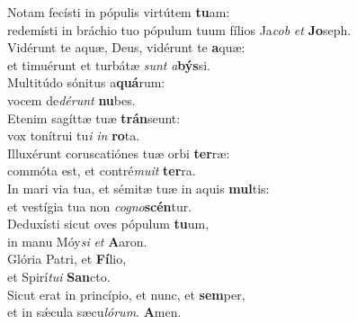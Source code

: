 \evenverse Notam fecísti in pópulis virtútem \textbf{tu}am:~\*\\
\evenverse redemísti in bráchio tuo pópulum tuum fílios Ja\textit{cob} \textit{et} \textbf{Jo}seph.\\
\oddverse Vidérunt te aquæ, Deus, vidérunt te \textbf{a}quæ:~\*\\
\oddverse et timuérunt et turbátæ \textit{sunt} \textit{a}\textbf{býs}si.\\
\evenverse Multitúdo sónitus a\textbf{quá}rum:~\*\\
\evenverse vocem de\textit{dé}\textit{runt} \textbf{nu}bes.\\
\oddverse Etenim sagíttæ tuæ \textbf{trán}seunt:~\*\\
\oddverse vox tonítrui tu\textit{i} \textit{in} \textbf{ro}ta.\\
\evenverse Illuxérunt coruscatiónes tuæ orbi \textbf{ter}ræ:~\*\\
\evenverse commóta est, et contré\textit{mu}\textit{it} \textbf{ter}ra.\\
\oddverse In mari via tua, et sémitæ tuæ in aquis \textbf{mul}tis:~\*\\
\oddverse et vestígia tua non \textit{co}\textit{gno}\textbf{scén}tur.\\
\evenverse Deduxísti sicut oves pópulum \textbf{tu}um,~\*\\
\evenverse in manu Móy\textit{si} \textit{et} \textbf{A}aron.\\
\oddverse Glória Patri, et \textbf{Fí}lio,~\*\\
\oddverse et Spirí\textit{tu}\textit{i} \textbf{San}cto.\\
\evenverse Sicut erat in princípio, et nunc, et \textbf{sem}per,~\*\\
\evenverse et in sǽcula sæcu\textit{ló}\textit{rum}. \textbf{A}men.\\
